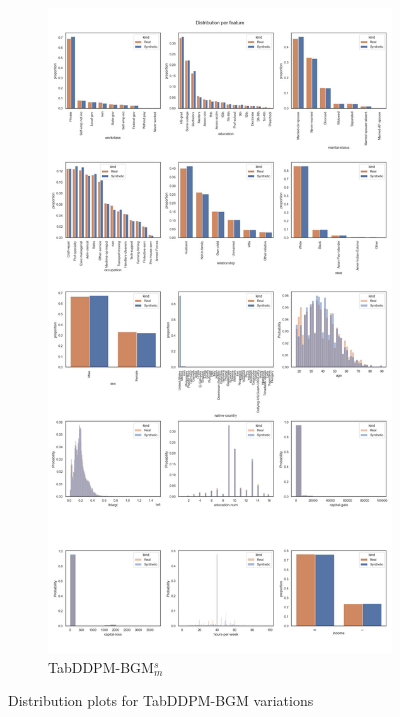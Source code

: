 \begin{landscape}
\begin{figure}[h]
\begin{subfigure}{0.3\linewidth}
			\includegraphics[height=\textheight,width=\linewidth,keepaspectratio]{images/distributions_full/tab-ddpm-bgm-simTune-minmax.jpg}
			\caption{TabDDPM-BGM$^{s}_m$}
		\end{subfigure}
		\caption{Distribution plots for TabDDPM-BGM variations}
		\label{fig_a:dist_4}
	\end{figure}
\end{landscape}
